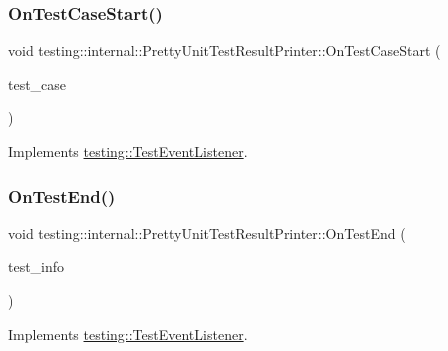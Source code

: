 \subsubsection{\texorpdfstring{OnTestCaseStart()}{OnTestCaseStart()}}
{\footnotesize\ttfamily void testing\+::internal\+::\+Pretty\+Unit\+Test\+Result\+Printer\+::\+On\+Test\+Case\+Start (\begin{DoxyParamCaption}\item[{const \mbox{\hyperlink{classtesting_1_1TestCase}{Test\+Case}} \&}]{test\+\_\+case }\end{DoxyParamCaption})\hspace{0.3cm}{\ttfamily [virtual]}}



Implements \mbox{\hyperlink{classtesting_1_1TestEventListener_ab4ed885d63f5bbff8076c1329b3dfe36}{testing\+::\+Test\+Event\+Listener}}.

\mbox{\label{classtesting_1_1internal_1_1PrettyUnitTestResultPrinter_a06749ff2b32a16c127374ecd015f13e0}} 
\subsubsection{\texorpdfstring{OnTestEnd()}{OnTestEnd()}}
{\footnotesize\ttfamily void testing\+::internal\+::\+Pretty\+Unit\+Test\+Result\+Printer\+::\+On\+Test\+End (\begin{DoxyParamCaption}\item[{const \mbox{\hyperlink{classtesting_1_1TestInfo}{Test\+Info}} \&}]{test\+\_\+info }\end{DoxyParamCaption})\hspace{0.3cm}{\ttfamily [virtual]}}



Implements \mbox{\hyperlink{classtesting_1_1TestEventListener_abb1c44525ef038500608b5dc2f17099b}{testing\+::\+Test\+Event\+Listener}}.

\mbox{\label{classtesting_1_1internal_1_1PrettyUnitTestResultPrinter_ac29b30216023baddda04ef5889f484ff}} 
